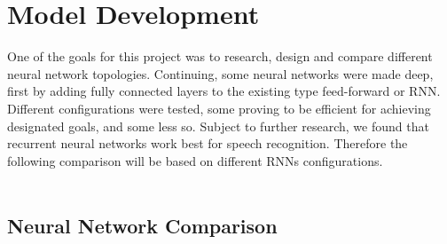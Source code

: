 \chapter{Model Development}\label{ch:model_development}

One of the goals for this project was to research, design and compare different neural network topologies. 
Continuing, some neural networks were made deep, first by adding fully connected layers to the existing type feed-forward or RNN.
Different configurations were tested, some proving to be efficient for achieving designated goals, and some less so.
Subject to further research, we found that recurrent neural networks work best for speech recognition.
Therefore  the following comparison will be based on different RNNs configurations.\\\\

\section{Neural Network Comparison}\label{sec:NNComparison}

